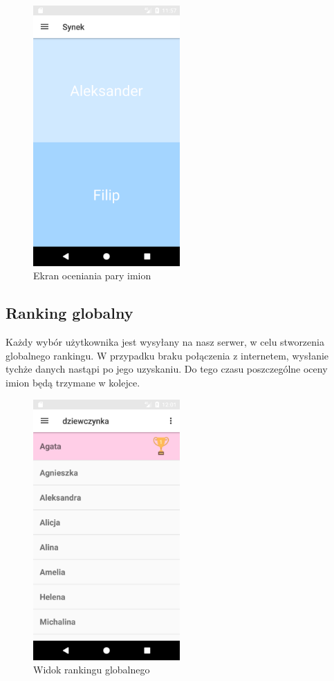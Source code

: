 \documentclass[12pt,a4paper]{article}
\begin{document}
\begin{figure}[h]
    \caption{Ekran oceniania pary imion}
    \centering
    \includegraphics[width=0.5\textwidth]{match}
\end{figure}

\subsection{Ranking globalny}
Każdy wybór użytkownika jest wysyłany na nasz serwer, w celu stworzenia globalnego rankingu.
W przypadku braku połączenia z internetem, wysłanie tychże danych nastąpi po jego uzyskaniu.
Do tego czasu poszczególne oceny imion będą trzymane w kolejce.

\begin{figure}[h]
    \caption{Widok rankingu globalnego}
    \centering
    \includegraphics[width=0.5\textwidth]{top}
\end{figure}
\end{document}
